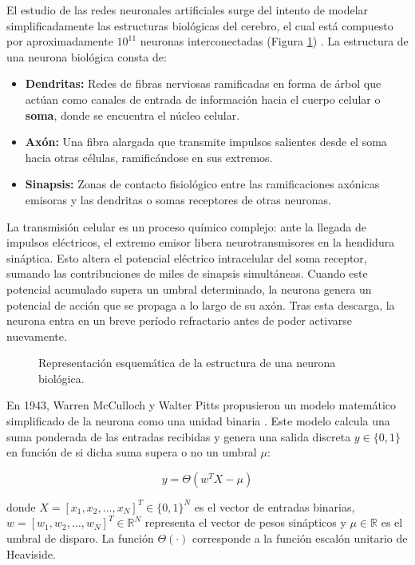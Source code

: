 El estudio de las redes neuronales artificiales surge del intento de modelar simplificadamente las estructuras biológicas del cerebro, el cual está compuesto por aproximadamente $10^{11}$ neuronas interconectadas (Figura \ref{fig:neurona}) \cite{Hertz1991}.
La estructura de una neurona biológica consta de:
\begin{itemize}
    \item \textbf{Dendritas:} Redes de fibras nerviosas ramificadas en forma de árbol que actúan como canales de entrada de información hacia el cuerpo celular o \textbf{soma}, donde se encuentra el núcleo celular.
    \item \textbf{Axón:} Una fibra alargada que transmite impulsos salientes desde el soma hacia otras células, ramificándose en sus extremos.
    \item \textbf{Sinapsis:} Zonas de contacto fisiológico entre las ramificaciones axónicas emisoras y las dendritas o somas receptores de otras neuronas.
\end{itemize}

La transmisión celular es un proceso químico complejo: ante la llegada de impulsos eléctricos, el extremo emisor libera neurotransmisores en la hendidura sináptica. Esto altera el potencial eléctrico intracelular del soma receptor, sumando las contribuciones de miles de sinapsis simultáneas. Cuando este potencial acumulado supera un umbral determinado, la neurona genera un potencial de acción que se propaga a lo largo de su axón. Tras esta descarga, la neurona entra en un breve período refractario antes de poder activarse nuevamente.

\begin{figure}[H]
    \centering
    \resizebox{0.95\textwidth}{!}{%
    }%
    \caption{Representación esquemática de la estructura de una neurona biológica.}
    \label{fig:neurona}
\end{figure}

En 1943, Warren McCulloch y Walter Pitts propusieron un modelo matemático simplificado de la neurona como una unidad binaria \cite{Hertz1991}. Este modelo calcula una suma ponderada de las entradas recibidas y genera una salida discreta $y \in \{0, 1\}$ en función de si dicha suma supera o no un umbral $\mu$:

\begin{equation}
    y = \Theta \left( w^T X - \mu \right)
\end{equation}

donde $X = [x_1, x_2, \dots, x_N]^T \in \{0, 1\}^N$ es el vector de entradas binarias, $w = [w_1, w_2, \dots, w_N]^T \in \mathbb{R}^N$ representa el vector de pesos sinápticos y $\mu \in \mathbb{R}$ es el umbral de disparo. La función $\Theta(\cdot)$ corresponde a la función escalón unitario de Heaviside.


